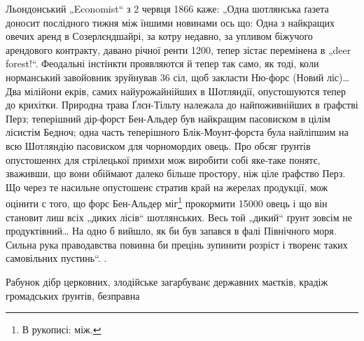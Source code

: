 {Льондонський „Economist“ з 2 червця 1866 каже: „Одна шотлянська ґазета доносит послідного тижня між
їншими новинами ось що: Одна з найкращих овечих аренд в Созерлєндшайрі, за котру недавно, за упливом
біжучого арендового контракту, давано річної ренти 1200, тепер зістає перемінена в
„deer forest!“. Феодальні інстінкти проявляются й тепер так само, як тоді, коли норманський
завойовник зруйнував 36 сіл, щоб закласти Ню-форс (Новий ліс)\dots{} Два мілійони екрів, самих
найурожайнійших в Шотляндії, опустошуются тепер до крихітки. Природна трава Ґлєн-Тільту належала до
найпоживнійших в ґрафстві Перз; теперішний дір-форст Бен-Альдер був найкращим пасовиском в цілім
лісистім Бедноч; одна часть теперішного Блік-Моунт-форста була найліпшим на всю Шотляндію пасовиском
для чорномордих овець. Про обсяг ґрунтів опустошеннх для стрілецької примхи мож виробити собі
яке-таке понятє, зваживши, що вони обіймают далеко більше простору, ніж ціле ґрафство Перз. Що через
те насильне опустошенє стратив край на жерелах продукції, мож оцінити с того, що форс Бен-Альдер
міг\footnote*{
В рукописі: між.
} прокормити \num{15000} овець і що він становит лиш  всіх „диких лісів“ шотлянських.
Весь той „дикий“ ґрунт зовсім не продуктівний\dots{} На одно б вийшло, як би був запався в фалі
Північного моря. Сильна рука праводавства повинна би прецінь зупинити розріст і творенє таких
самовільних пустинь“.
}.

Рабунок дібр церковних, злодійське загарбуванє державних маєтків, крадіж громадських ґрунтів,
безправна \parbreak{}
